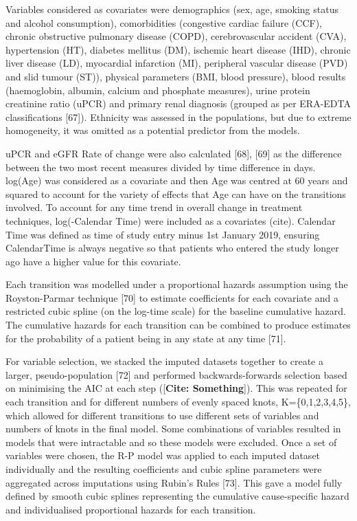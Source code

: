 \documentclass[12pt,twoside]{reedthesis}
\begin{document}
Variables considered as covariates were demographics (sex, age, smoking status and alcohol consumption), comorbidities (congestive cardiac failure (CCF), chronic obstructive pulmonary disease (COPD), cerebrovascular accident (CVA), hypertension (HT), diabetes mellitus (DM), ischemic heart disease (IHD), chronic liver disease (LD), myocardial infarction (MI), peripheral vascular disease (PVD) and slid tumour (ST)), physical parameters (BMI, blood pressure), blood results (haemoglobin, albumin, calcium and phosphate measures), urine protein creatinine ratio (uPCR) and primary renal diagnosis (grouped as per ERA-EDTA classifications {[}67{]}). Ethnicity was assessed in the populations, but due to extreme homogeneity, it was omitted as a potential predictor from the models.

uPCR and eGFR Rate of change were also calculated {[}68{]}, {[}69{]} as the difference between the two most recent measures divided by time difference in days. log(Age) was considered as a covariate and then Age was centred at 60 years and squared to account for the variety of effects that Age can have on the transitions involved. To account for any time trend in overall change in treatment techniques, log(-Calendar Time) were included as a covariates (cite). Calendar Time was defined as time of study entry minus 1st January 2019, ensuring CalendarTime is always negative so that patients who entered the study longer ago have a higher value for this covariate.

Each transition was modelled under a proportional hazards assumption using the Royston-Parmar technique {[}70{]} to estimate coefficients for each covariate and a restricted cubic spline (on the log-time scale) for the baseline cumulative hazard. The cumulative hazards for each transition can be combined to produce estimates for the probability of a patient being in any state at any time {[}71{]}.

For variable selection, we stacked the imputed datasets together to create a larger, pseudo-population {[}72{]} and performed backwards-forwards selection based on minimising the AIC at each step ({[}\textbf{Cite: Something}{]}). This was repeated for each transition and for different numbers of evenly spaced knots, K=\{0,1,2,3,4,5\}, which allowed for different transitions to use different sets of variables and numbers of knots in the final model. Some combinations of variables resulted in models that were intractable and so these models were excluded. Once a set of variables were chosen, the R-P model was applied to each imputed dataset individually and the resulting coefficients and cubic spline parameters were aggregated across imputations using Rubin's Rules {[}73{]}. This gave a model fully defined by smooth cubic splines representing the cumulative cause-specific hazard and individualised proportional hazards for each transition.
\end{document}
